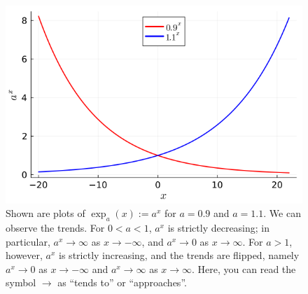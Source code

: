 \bigskip
\begin{figure}[htb!]%
\centering
\includegraphics[width=0.70\columnwidth]{graphics/Chap01/ExponentialPlot.png}%
\caption[]{Shown are plots of $\exp_a(x):=a^x$ for $a=0.9$ and $a=1.1$. We can observe the trends. For $0 < a <1$, $a^x$ is strictly decreasing; in particular, $a^x \to \infty$ as $x \to -\infty$, and $a^x \to 0$ as $x \to \infty$. For $a>1$, however, $a^x$ is strictly increasing, and the trends are flipped, namely $a^x \to 0$ as $x \to -\infty$ and $a^x \to \infty$ as $x \to \infty$. Here, you can read the symbol $\to$ as ``tends to'' or ``approaches''.}
    \label{fig:ExponentialPlots}
\end{figure}

